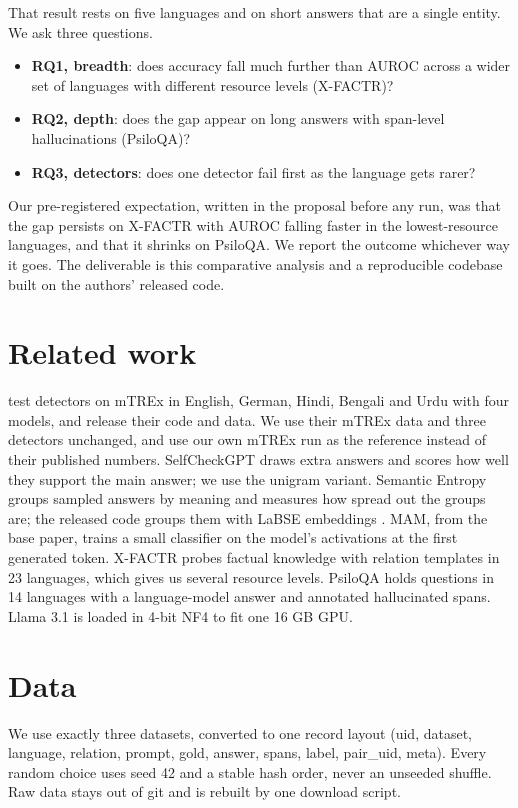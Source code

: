 \documentclass[12pt]{article}
\begin{document}
That result rests on five languages and on short answers that are a single entity. We ask three questions.

\begin{itemize}
\item \textbf{RQ1, breadth}: does accuracy fall much further than AUROC across a wider set of languages with different resource levels (X-FACTR)?
\item \textbf{RQ2, depth}: does the gap appear on long answers with span-level hallucinations (PsiloQA)?
\item \textbf{RQ3, detectors}: does one detector fail first as the language gets rarer?
\end{itemize}

Our pre-registered expectation, written in the proposal before any run, was that the gap persists on X-FACTR with AUROC falling faster in the lowest-resource languages, and that it shrinks on PsiloQA. We report the outcome whichever way it goes. The deliverable is this comparative analysis and a reproducible codebase built on the authors' released code.

\section{Related work}
\citet{datta2026} test detectors on mTREx in English, German, Hindi, Bengali and Urdu with four models, and release their code and data. We use their mTREx data and three detectors unchanged, and use our own mTREx run as the reference instead of their published numbers. SelfCheckGPT \citep{manakul2023} draws extra answers and scores how well they support the main answer; we use the unigram variant. Semantic Entropy \citep{farquhar2024} groups sampled answers by meaning and measures how spread out the groups are; the released code groups them with LaBSE embeddings \citep{feng2022}. MAM, from the base paper, trains a small classifier on the model's activations at the first generated token. X-FACTR \citep{jiang2020} probes factual knowledge with relation templates in 23 languages, which gives us several resource levels. PsiloQA \citep{psiloqa} holds questions in 14 languages with a language-model answer and annotated hallucinated spans. Llama 3.1 \citep{grattafiori2024} is loaded in 4-bit NF4 \citep{dettmers2023} to fit one 16 GB GPU.

\section{Data}
We use exactly three datasets, converted to one record layout (uid, dataset, language, relation, prompt, gold, answer, spans, label, pair\_uid, meta). Every random choice uses seed 42 and a stable hash order, never an unseeded shuffle. Raw data stays out of git and is rebuilt by one download script.
\end{document}

